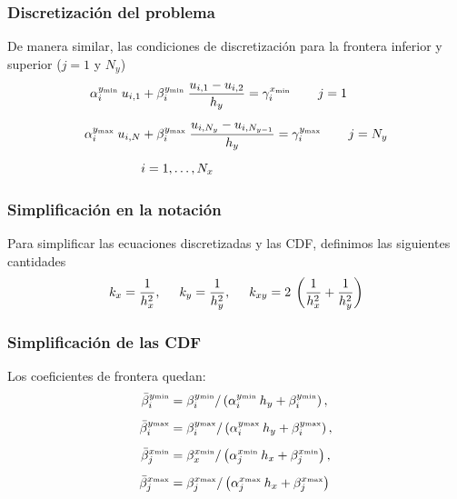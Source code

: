\begin{frame}
\frametitle{Discretización del problema}
De manera similar, las condiciones de discretización para la frontera inferior y superior ($j = 1$ y $N_{y}$)
\begin{align*}
\alpha_{i}^{y_{\text{\tiny{min}}}} \: u_{i, 1} &+ \beta_{i}^{y_{\text{\tiny{min}}}} \: \dfrac{u_{i, 1} - u_{i, 2}}{h_{y}} = \gamma_{i}^{x_{\text{\tiny{min}}}} \hspace{0.75cm} j = 1 \\[0.5em]
\alpha_{i}^{y_{\text{\tiny{max}}}} \: u_{i, N} &+ \beta_{i}^{y_{\text{\tiny{max}}}} \: \dfrac{u_{i, N_{y}} - u_{i, N_{y-1}}}{h_{y}} = \gamma_{i}^{y_{\text{\tiny{max}}}} \hspace{0.75cm} j = N_{y} \\[0.5em]
&i = 1, \ldots, N_{x}
\end{align*}
\end{frame}
\begin{frame}
\frametitle{Simplificación en la notación}
Para simplificar las ecuaciones discretizadas y las CDF, definimos las siguientes cantidades
\begin{align}
k_{x} = \dfrac{1}{h_{x}^{2}}, \hspace{0.5cm} k_{y} = \dfrac{1}{h_{y}^{2}}, \hspace{0.5cm} k_{xy} = 2 \: \left( \dfrac{1}{h_{x}^{2}} + \dfrac{1}{h_{y}^{2}} \right)
\label{eq:ecuacion_13_07}
\end{align}
\end{frame}
\begin{frame}
\frametitle{Simplificación de las CDF}
Los coeficientes de frontera quedan:
\begin{align}
\begin{aligned}
\bar{\beta}_{i}^{y {\text{\tiny{min}}}} &= \beta_{i}^{y {\text{\tiny{min}}}} / \left( \alpha_{i}^{y {\text{\tiny{min}}}} \: h_{y}  + \beta_{i}^{y{\mbox{\tiny{min}}}} \right), \\[0.5em]
\bar{\beta}_{i}^{y {\text{\tiny{max}}}} &= \beta_{i}^{y {\text{\tiny{max}}}} / \left( \alpha_{i}^{y {\text{\tiny{max}}}} \: h_{y}  + \beta_{i}^{y{\mbox{\tiny{max}}}} \right), \\[0.5em]
\bar{\beta}_{j}^{x {\text{\tiny{min}}}} &= \beta_{x}^{x {\text{\tiny{min}}}} / \left( \alpha_{j}^{x {\text{\tiny{min}}}} \: h_{x}  + \beta_{j}^{x {\mbox{\tiny{min}}}} \right), \\[0.5em]
\bar{\beta}_{j}^{x {\text{\tiny{max}}}} &= \beta_{j}^{x {\text{\tiny{max}}}} / \left( \alpha_{j}^{x {\text{\tiny{max}}}} \: h_{x}  + \beta_{j}^{x {\mbox{\tiny{max}}}} \right)
\end{aligned}
\label{eq:ecuacion_13_08a}
\end{align}
\end{frame}
